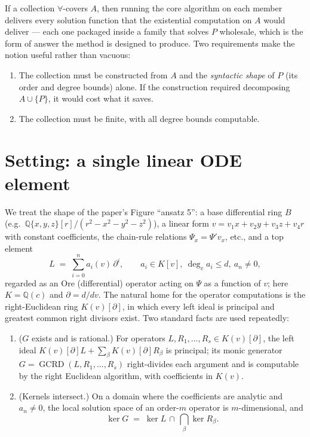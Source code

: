 \documentclass[11pt]{article}
\DeclareMathOperator{\GCRD}{GCRD}
\begin{document}
If a collection $\forall$-covers $A$, then running the core algorithm on each
member delivers every solution function that the existential computation on
$A$ would deliver --- each one packaged inside a family that solves $P$
wholesale, which is the form of answer the method is designed to produce. Two
requirements make the notion useful rather than vacuous:

\begin{enumerate}
\item The collection must be constructed from $A$ and the \emph{syntactic
      shape} of $P$ (its order and degree bounds) alone. If the construction
      required decomposing $A \cup \{P\}$, it would cost what it saves.
\item The collection must be finite, with all degree bounds computable.
\end{enumerate}

\section{Setting: a single linear ODE element}
\label{sec:setting}

We treat the shape of the paper's Figure ``ansatz 5'': a base differential
ring $B$ (e.g.\ $\mathbb{Q}\{x,y,z\}[r]/(r^2 - x^2 - y^2 - z^2)$), a linear
form $v = v_1 x + v_2 y + v_3 z + v_4 r$ with constant coefficients, the
chain-rule relations $\Psi_x = \Psi' v_x$, etc., and a top element
\begin{equation}
\label{eq:L}
L \;=\; \sum_{i=0}^{n} a_i(v)\,\partial^i,
\qquad a_i \in K[v],\ \deg_v a_i \le d,\ a_n \neq 0,
\end{equation}
regarded as an Ore (differential) operator acting on $\Psi$ as a function of
$v$; here $K = \mathbb{Q}(c)$ and $\partial = d/dv$. The natural home for the
operator computations is the right-Euclidean ring $K(v)[\partial]$, in which
every left ideal is principal and greatest common right divisors exist. Two
standard facts \cite{ore,vdps} are used repeatedly:

\begin{enumerate}
\item ($G$ exists and is rational.) For operators $L, R_1, \dots, R_s \in
      K(v)[\partial]$, the left ideal $K(v)[\partial]L + \sum_\beta
      K(v)[\partial]R_\beta$ is principal; its monic generator
      $G = \GCRD(L, R_1, \dots, R_s)$ right-divides each argument and is
      computable by the right Euclidean algorithm, with coefficients in
      $K(v)$.
\item (Kernels intersect.) On a domain where the coefficients are analytic
      and $a_n \neq 0$, the local solution space of an order-$m$ operator is
      $m$-dimensional, and
      \[
      \ker G \;=\; \ker L \,\cap\, \bigcap_\beta \ker R_\beta .
      \]
\end{enumerate}
\end{document}
